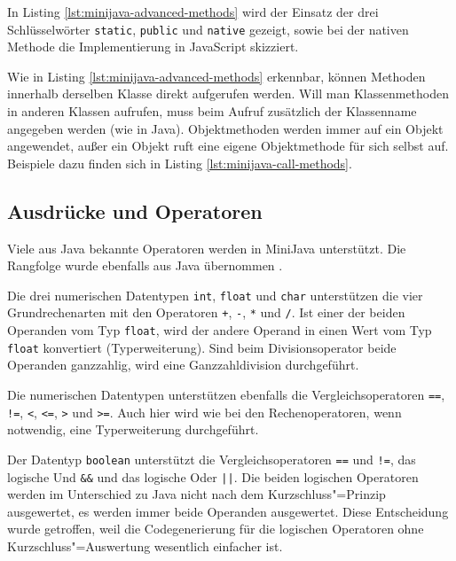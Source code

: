 In Listing \ref{lst:minijava-advanced-methods} wird der Einsatz der drei Schlüsselwörter \lstinline{static}, \lstinline{public} und \lstinline{native} gezeigt, sowie bei der nativen Methode die Implementierung in JavaScript skizziert.

\pagebreak


Wie in Listing \ref{lst:minijava-advanced-methods} erkennbar, können Methoden innerhalb derselben Klasse direkt aufgerufen werden. Will man Klassenmethoden in anderen Klassen aufrufen, muss beim Aufruf zusätzlich der Klassenname angegeben werden (wie in Java). Objektmethoden werden immer auf ein Objekt angewendet, außer ein Objekt ruft eine eigene Objektmethode für sich selbst auf. Beispiele dazu finden sich in Listing \ref{lst:minijava-call-methods}.



\subsection{Ausdrücke und Operatoren}

Viele aus Java bekannte Operatoren werden in MiniJava unterstützt. Die Rangfolge wurde ebenfalls aus Java übernommen \cite{JavaOperators}.

Die drei numerischen Datentypen \lstinline{int}, \lstinline{float} und \lstinline{char} unterstützen die vier Grundrechenarten mit den Operatoren \lstinline{+}, \lstinline{-}, \lstinline{*} und \lstinline{/}. Ist einer der beiden Operanden vom Typ \lstinline{float}, wird der andere Operand in einen Wert vom Typ \lstinline{float} konvertiert (Typerweiterung). Sind beim Divisionsoperator beide Operanden ganzzahlig, wird eine Ganzzahldivision durchgeführt.

Die numerischen Datentypen unterstützen ebenfalls die Vergleichsoperatoren \lstinline{==}, \lstinline{!=}, \mbox{\lstinline{<},} \lstinline{<=}, \lstinline{>} und \lstinline{>=}. Auch hier wird wie bei den Rechenoperatoren, wenn notwendig, eine Typerweiterung durchgeführt.

Der Datentyp \lstinline{boolean} unterstützt die Vergleichsoperatoren \lstinline{==} und \lstinline{!=}, das logische Und \lstinline{&&} und das logische Oder \lstinline{||}. Die beiden logischen Operatoren werden im Unterschied zu Java nicht nach dem Kurzschluss"=Prinzip ausgewertet, es werden immer beide Operanden ausgewertet. Diese Entscheidung wurde getroffen, weil die Codegenerierung für die logischen Operatoren ohne Kurzschluss"=Auswertung wesentlich einfacher ist.

